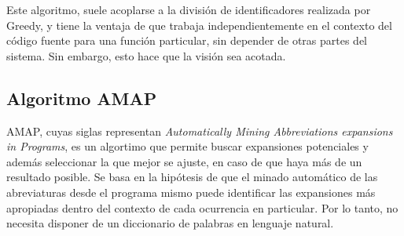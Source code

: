 Este algoritmo, suele acoplarse a la división de identificadores realizada por Greedy, y tiene la ventaja de que trabaja independientemente en el contexto del código fuente para una función particular, sin depender de otras partes del sistema. Sin embargo, esto hace que la visión sea acotada.

\subsection{Algoritmo AMAP}
AMAP, cuyas siglas representan \textit{Automatically Mining Abbreviations expansions in Programs}, es un algortimo que permite buscar expansiones potenciales y además seleccionar la que mejor se ajuste, en caso de que haya más de un resultado posible.
Se basa en la hipótesis de que el minado automático de las abreviaturas desde el programa mismo puede identificar las expansiones más apropiadas dentro del contexto de cada ocurrencia en particular.
Por lo tanto, no necesita disponer de un diccionario de palabras en lenguaje natural.

